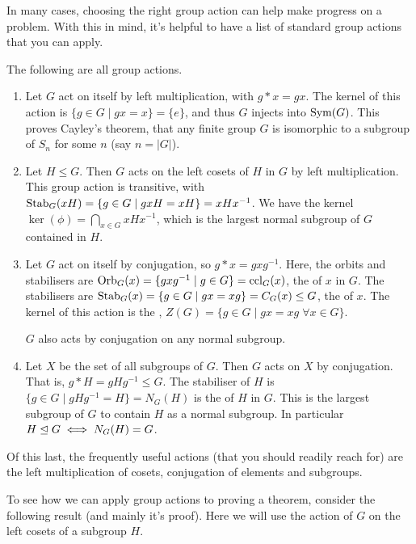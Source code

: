 \documentclass[a4paper]{scrartcl}
\begin{document}
In many cases, choosing the right group action can help make progress on a problem. With this in mind, it's helpful to have a list of standard group actions that you can apply.

\begin{example}
	The following are all group actions.
	\begin{enumerate}[label=(\roman*)]
		\item Let $G$ act on itself by left multiplication, with $g * x = gx$. The kernel of this action is $\{g \in G \mid gx = x \} = \{e\}$, and thus $G$ injects into $\operatorname{Sym}(G)$. This proves Cayley's theorem, that any finite group $G$ is isomorphic to a subgroup of $S_n$ for some $n$ (say $n = |G|$).
		\item Let $H \leq G$. Then $G$ acts on the left cosets of $H$ in $G$ by left multiplication. This group action is transitive, with $\operatorname{Stab}_G(xH) = \{ g \in G \mid gxH = xH \} = xHx^{-1}$. We have the kernel $\ker(\phi) = \bigcap_{x \in G} xHx^{-1}$, which is the largest normal subgroup of $G$ contained in $H$.
		\item Let $G$ act on itself by conjugation, so $g * x = gxg^{-1}$. Here, the orbits and stabilisers are $\operatorname{Orb}_G(x) = \{ gxg^{-1} \mid g \in G \} = \operatorname{ccl}_G(x)$, the  of $x$ in $G$. The stabilisers are $\operatorname{Stab}_G(x) = \{ g \in G \mid gx = xg \} = C_G(x) \leq G$, the  of $x$. The kernel of this action is the , $Z(G) = \{ g \in G \mid gx = xg \; \forall x \in G \}$.
		
		$G$ also acts by conjugation on any normal subgroup.

		\item Let $X$ be the set of all subgroups of $G$. Then $G$ acts on $X$ by conjugation. That is, $g * H = g H g^{-1} \leq G$. The stabiliser of $H$ is $\{g \in G \mid gHg^{-1} = H \} = N_G(H)$ is the  of $H$ in $G$. This is the largest subgroup of $G$ to contain $H$ as a normal subgroup. In particular $H \trianglelefteq G \iff N_G(H) = G$. 
	\end{enumerate}
\end{example}

Of this last, the frequently useful actions (that you should readily reach for) are the left multiplication of cosets, conjugation of elements and subgroups.


To see how we can apply group actions to proving a theorem, consider the following result (and mainly it's proof). Here we will use the action of $G$ on the left cosets of a subgroup $H$.
\end{document}
